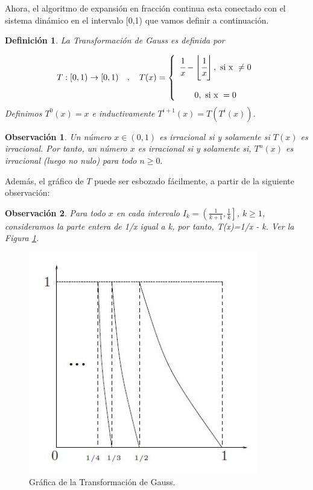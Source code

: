 \documentclass[12pt]{report}
\newtheorem{obs}{{Observación}}[section]
\newtheorem{defi}{Definición}[section]
\begin{document}
Ahora, el algoritmo de expansión en fracción continua esta conectado con el sistema dinámico en el intervalo [0,1) que vamos definir a continuación.

\begin{defi}
La Transformación de Gauss es definida por

\[
T:[0,1) \rightarrow[0,1)\quad,\quad T(x)=\left\{\begin{array}{c}
\cfrac{1}{x}-\left\lfloor\cfrac{1}{x}\right\rfloor, \text{ si x } \neq 0  \\\\
0, \text{ si x }  = 0
\end{array}\right.
\]
Definimos $T^{0}(x)=x$ e inductivamente $T^{i+1}(x)=T(T^{i}(x))$.
\end{defi}

\begin{obs}
Un número $x\in (0,1)$ es irracional si y solamente si $T(x)$ es irracional. Por tanto, un número $x$ es irracional si y solamente si, $T^{n}(x)$ es irracional (luego no nulo) para todo $n\geq0.$
\label{obs2}
\end{obs}

Además, el gráfico de $T$ puede ser esbozado fácilmente, a partir de la siguiente observación:
\begin{obs}
Para todo $x$ en cada intervalo $I_{k}=\left(\frac{1}{k+1},\frac{1}{k}\right]$, $k\geq1$, consideramos la parte entera de 1/x igual a k, por tanto, T(x)=1/x - k. Ver la Figura \ref{fig1}.
\end{obs}
\begin{figure}[h]
    \centering
    \includegraphics[width=10cm]{TG.JPG}
    \caption{Gráfica de la Transformación de Gauss.}
    \label{fig1}
\end{figure}
\end{document}
